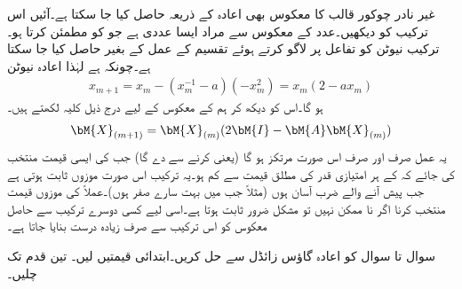 غیر نادر چوکور قالب کا معکوس بھی اعادہ کے ذریعہ حاصل کیا جا سکتا ہے۔آئیں اس ترکیب کو دیکھیں۔عدد  کے معکوس  سے مراد ایسا عددی ہے جو  کو مطمئن کرتا ہو۔ترکیب نیوٹن کو تفاعل  پر لاگو کرتے ہوئے تقسیم کے عمل کے بغیر  حاصل کیا جا سکتا ہے۔چونکہ  ہے لہٰذا اعادہ نیوٹن
\begin{align*}
x_{m+1}=x_m-(x_m^{-1}-a)(-x_m^2)=x_m(2-ax_m)
\end{align*}
ہو گا۔اس کو دیکھ کر ہم  کے معکوس  کے لیے درج ذیل کلیہ لکھتے ہیں۔
\begin{align}\label{مساوات_خطی_اعدادی_مثال_ج}
\bM{X}_{(m+1)}=\bM{X}_{(m)}(2\bM{I}-\bM{A}\bM{X}_{(m)})
\end{align}
یہ عمل صرف اور صرف اس صورت مرتکز ہو گا (یعنی  کرنے سے  دے گا) جب  کی ایسی قیمت منتخب کی جائے کہ  کے ہر امتیازی قدر  کی مطلق قیمت  سے کم ہو۔یہ ترکیب اس صورت موزوں ثابت ہوتی ہے جب پیش آنے والے ضرب آسان ہوں (مثلاً جب  میں بہت سارے صفر ہوں)۔عملاً   کی موزوں قیمت منتخب کرنا اگر نا ممکن نہیں تو مشکل ضرور  ثابت ہوتا ہے۔اسی لیے کسی دوسرے ترکیب سے حاصل معکوس کو اس ترکیب سے صرف زیادہ درست بنایا جاتا ہے۔ 

سوال  تا سوال  کو اعادہ گاؤس زائڈل سے حل کریں۔ابتدائی قیمتیں  لیں۔ تین قدم تک چلیں۔

